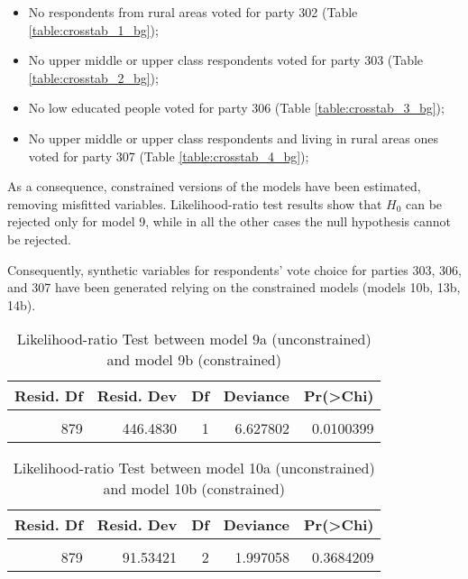 \documentclass[
]{article}
\providecommand{\tightlist}{%
  \setlength{\itemsep}{0pt}\setlength{\parskip}{0pt}}
\begin{document}
\begin{itemize}
\tightlist
\item
  No respondents from rural areas voted for party 302 (Table \ref{table:crosstab_1_bg});
\item
  No upper middle or upper class respondents voted for party 303 (Table \ref{table:crosstab_2_bg});
\item
  No low educated people voted for party 306 (Table \ref{table:crosstab_3_bg});
\item
  No upper middle or upper class respondents and living in rural areas ones voted for party 307
  (Table \ref{table:crosstab_4_bg});
\end{itemize}

As a consequence, constrained versions of the models have been estimated,
removing misfitted variables. Likelihood-ratio test results show that \(H_0\) can be rejected only for model 9, while in all the other cases the null hypothesis cannot be rejected.

Consequently, synthetic variables for respondents' vote choice for parties 303, 306, and 307 have been
generated relying on the constrained models (models 10b, 13b, 14b).

\begin{table}[!h]

\caption{\label{tab:unnamed-chunk-19}Likelihood-ratio Test between model 9a (unconstrained) and model 9b (constrained)
                  \label{table:lrtest_1_bg}}
\centering
\begin{tabular}[t]{r|r|r|r|r}
\hline
Resid. Df & Resid. Dev & Df & Deviance & Pr(>Chi)\\
\hline
\cellcolor{gray!6}{880} & \cellcolor{gray!6}{453.1108} & \cellcolor{gray!6}{} & \cellcolor{gray!6}{} & \cellcolor{gray!6}{}\\
\hline
879 & 446.4830 & 1 & 6.627802 & 0.0100399\\
\hline
\end{tabular}
\end{table}

\begin{table}[!h]

\caption{\label{tab:unnamed-chunk-19}Likelihood-ratio Test between model 10a (unconstrained) and model 10b (constrained)
                  \label{table:lrtest_2_bg}}
\centering
\begin{tabular}[t]{r|r|r|r|r}
\hline
Resid. Df & Resid. Dev & Df & Deviance & Pr(>Chi)\\
\hline
\cellcolor{gray!6}{881} & \cellcolor{gray!6}{93.53127} & \cellcolor{gray!6}{} & \cellcolor{gray!6}{} & \cellcolor{gray!6}{}\\
\hline
879 & 91.53421 & 2 & 1.997058 & 0.3684209\\
\hline
\end{tabular}
\end{table}
\end{document}
